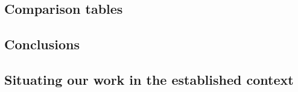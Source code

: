\subsection{Comparison tables}





\subsection{Conclusions}



\subsection{Situating our work in the established context}
